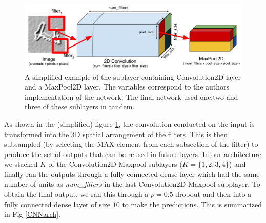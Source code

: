 \documentclass[conference]{IEEEtran}
\begin{document}
\begin{figure}[h]
	\includegraphics[scale=0.40]{convnet_example.pdf}
	\caption{A simplified example of the sublayer containing Convolution2D layer and a MaxPool2D layer. The variables correspond to the authors implementation of the network. The final network used one,two and three of these sublayers in tandem.}
	\label{convmaxlayer}
\end{figure}

As shown in the (simplified) figure \ref{convmaxlayer}, the convolution conducted on the input is transformed into the 3D spatial arrangement of the filters. This is then subsampled (by selecting the MAX element from each subsection of the filter) to produce the set of outputs that can be reused in future layers. In our architecture we stacked $K$ of the Convolution2D-Maxpool sublayers ($K=\{1,2,3,4\}$) and finally ran the outputs through a fully connected dense layer which had the same number of units as \emph{num\_filters} in the last Convolution2D-Maxpool subplayer. To obtain the final output, we ran this through a $p=0.5$ dropout and then into a fully connected dense layer of size $10$ to make the predictions. This is summarized in Fig \ref{CNNarch}. 
\end{document}
